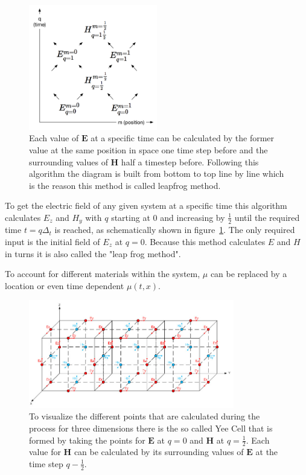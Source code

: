 \begin{figure}[!h]
  \centering
  \includegraphics[width=0.5\textwidth]{./images/space-time-cell.png}
  \caption{Each value of $\mathbf{E}$ at a specific time can be calculated by the former value at the same position in space one time step before and the surrounding values of $\mathbf{H}$ half a timestep before. Following this algorithm the diagram is built from bottom to top line by line which is the reason this method is called leapfrog method. }
  \label{fig:leapfrog}
\end{figure}

To get the electric field of any given system at a specific time this algorithm calculates $E_z$ and $H_y$ with $q$ starting at 0 and increasing by $\frac{1}{2}$ until the required time $t = q\Delta_t$ is reached, as schematically shown in figure~\ref{fig:leapfrog}. The only required input is the initial field of $E_z$ at $q = 0$. Because this method calculates $E$ and $H$ in turns it is also called the "leap frog method".

To account for different materials within the system, $\mu$ can be replaced by a location or even time dependent $\mu(t, x)$.

\begin{figure}[!h]
  \centering
  \includegraphics[width=0.8\textwidth]{./images/yeecell.jpg}
  \caption{To visualize the different points that are calculated during the process for three dimensions there is the so called Yee Cell that is formed by taking the points for $\mathbf{E}$ at $q=0$ and $\mathbf{H}$ at $q=\frac{1}{2}$. Each value for $\mathbf{H}$ can be calculated by its surrounding values of $\mathbf{E}$ at the time step $q-\frac{1}{2}$. \mcite}
\end{figure}


